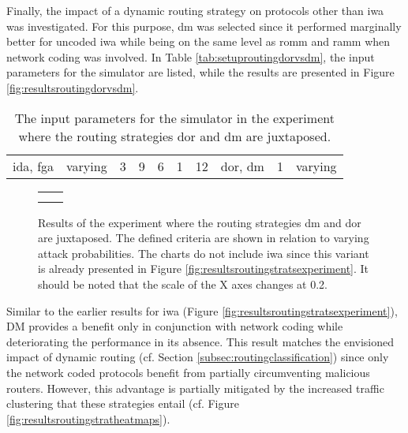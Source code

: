 Finally, the impact of a dynamic routing strategy on protocols other than \gls{iwa} was investigated. For this purpose, \gls{dm} was selected since it
performed marginally better for uncoded \gls{iwa} while being on the same level as \gls{romm} and \gls{ramm} when network coding was involved. In
Table \vref{tab:setuproutingdorvsdm}, the input parameters for the simulator are listed, while the results are presented in Figure
\vref{fig:resultsroutingdorvsdm}.

\begin{table}
    \centering
    \begin{tabulary}{\textwidth}{C|C|C|C|C|C|C|C|C|C}
        \pProtVar{} & \pNCMode{} & \pEncMods{} & \pAuthMods{} & \pRQSize{} & \pARQLimit{} & \pARQTimeout{} & \pRStrat{} & \pAttackerSet{} & \pAttackProb{} \\\hline
        \gls{ida}, \gls{fga} & varying & 3 & 9 & 6 & 1 & 12 & \gls{dor}, \gls{dm} & 1 & varying \\
    \end{tabulary}
    \caption[Input parameters for the DOR and DM comparisons]{The input parameters for the simulator in the experiment where the routing strategies
    \gls{dor} and \gls{dm} are juxtaposed.}
    \label{tab:setuproutingdorvsdm}
\end{table}

\begin{figure}
    \centering
    \begin{tabular}{cc}
         &  \\
         & 
    \end{tabular}
    \caption[Results for the DOR and DM comparisons]{Results of the experiment where the routing strategies \gls{dm} and \gls{dor} are juxtaposed. The
    defined criteria are shown in relation to varying attack probabilities. The charts do not include \gls{iwa} since this variant is already
    presented in Figure \ref{fig:resultsroutingstratsexperiment}. It should be noted that the scale of the X axes changes at 0.2.}
    \label{fig:resultsroutingdorvsdm}
\end{figure}

Similar to the earlier results for \gls{iwa} (Figure \ref{fig:resultsroutingstratsexperiment}), DM provides a benefit only in conjunction with network
coding while deteriorating the performance in its absence. This result matches the envisioned impact of dynamic routing (cf. Section
\ref{subsec:routingclassification}) since only the network coded protocols benefit from partially circumventing malicious routers. However, this
advantage is partially mitigated by the increased traffic clustering that these strategies entail (cf. Figure \ref{fig:resultsroutingstratheatmaps}).

